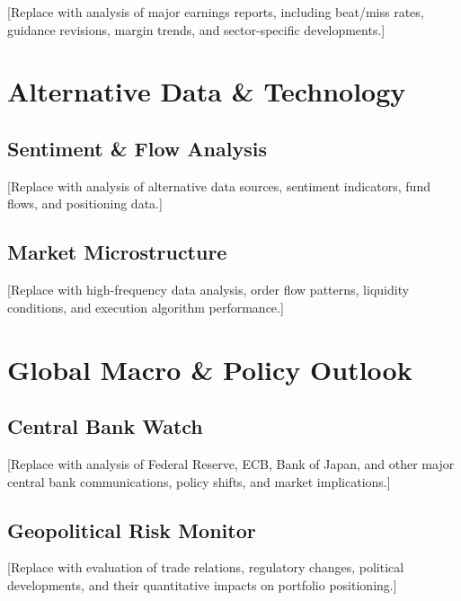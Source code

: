 \documentclass[11pt,a4paper]{article}
\begin{document}
[Replace with analysis of major earnings reports, including beat/miss rates, guidance revisions, margin trends, and sector-specific developments.]

\section{Alternative Data \& Technology}

\subsection{Sentiment \& Flow Analysis}

[Replace with analysis of alternative data sources, sentiment indicators, fund flows, and positioning data.]

\subsection{Market Microstructure}

[Replace with high-frequency data analysis, order flow patterns, liquidity conditions, and execution algorithm performance.]

\section{Global Macro \& Policy Outlook}

\subsection{Central Bank Watch}

[Replace with analysis of Federal Reserve, ECB, Bank of Japan, and other major central bank communications, policy shifts, and market implications.]

\subsection{Geopolitical Risk Monitor}

[Replace with evaluation of trade relations, regulatory changes, political developments, and their quantitative impacts on portfolio positioning.]
\end{document}
